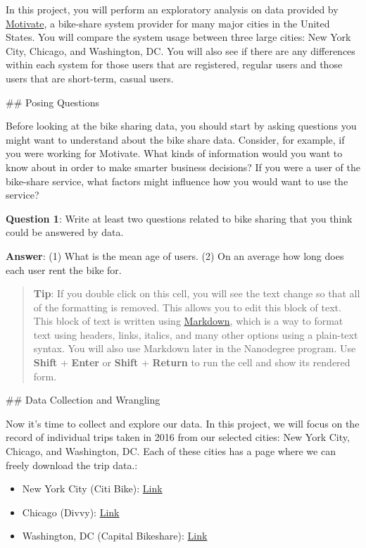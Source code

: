 \documentclass[11pt]{article}
\providecommand{\tightlist}{%
      \setlength{\itemsep}{0pt}\setlength{\parskip}{0pt}}
\begin{document}
In this project, you will perform an exploratory analysis on data
provided by \href{https://www.motivateco.com/}{Motivate}, a bike-share
system provider for many major cities in the United States. You will
compare the system usage between three large cities: New York City,
Chicago, and Washington, DC. You will also see if there are any
differences within each system for those users that are registered,
regular users and those users that are short-term, casual users.

     \#\# Posing Questions

Before looking at the bike sharing data, you should start by asking
questions you might want to understand about the bike share data.
Consider, for example, if you were working for Motivate. What kinds of
information would you want to know about in order to make smarter
business decisions? If you were a user of the bike-share service, what
factors might influence how you would want to use the service?

\textbf{Question 1}: Write at least two questions related to bike
sharing that you think could be answered by data.

\textbf{Answer}: (1) What is the mean age of users. (2) On an average
how long does each user rent the bike for.

\begin{quote}
\textbf{Tip}: If you double click on this cell, you will see the text
change so that all of the formatting is removed. This allows you to edit
this block of text. This block of text is written using
\href{http://daringfireball.net/projects/markdown/syntax}{Markdown},
which is a way to format text using headers, links, italics, and many
other options using a plain-text syntax. You will also use Markdown
later in the Nanodegree program. Use \textbf{Shift} + \textbf{Enter} or
\textbf{Shift} + \textbf{Return} to run the cell and show its rendered
form.
\end{quote}

     \#\# Data Collection and Wrangling

Now it's time to collect and explore our data. In this project, we will
focus on the record of individual trips taken in 2016 from our selected
cities: New York City, Chicago, and Washington, DC. Each of these cities
has a page where we can freely download the trip data.:

\begin{itemize}
\tightlist
\item
  New York City (Citi Bike):
  \href{https://www.citibikenyc.com/system-data}{Link}
\item
  Chicago (Divvy): \href{https://www.divvybikes.com/system-data}{Link}
\item
  Washington, DC (Capital Bikeshare):
  \href{https://www.capitalbikeshare.com/system-data}{Link}
\end{itemize}
\end{document}
